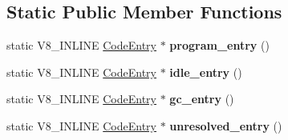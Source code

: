 \subsection*{Static Public Member Functions}
\begin{DoxyCompactItemize}
\item 
\mbox{\label{classv8_1_1internal_1_1CodeEntry_ae46bd95cd925a33436b007edaf1cb382}} 
static V8\+\_\+\+I\+N\+L\+I\+NE \mbox{\hyperlink{classv8_1_1internal_1_1CodeEntry}{Code\+Entry}} $\ast$ {\bfseries program\+\_\+entry} ()
\item 
\mbox{\label{classv8_1_1internal_1_1CodeEntry_af967b3b9da0154f68acc1e1c83798410}} 
static V8\+\_\+\+I\+N\+L\+I\+NE \mbox{\hyperlink{classv8_1_1internal_1_1CodeEntry}{Code\+Entry}} $\ast$ {\bfseries idle\+\_\+entry} ()
\item 
\mbox{\label{classv8_1_1internal_1_1CodeEntry_a7012418efaf8f148bc37a791173bab98}} 
static V8\+\_\+\+I\+N\+L\+I\+NE \mbox{\hyperlink{classv8_1_1internal_1_1CodeEntry}{Code\+Entry}} $\ast$ {\bfseries gc\+\_\+entry} ()
\item 
\mbox{\label{classv8_1_1internal_1_1CodeEntry_abf6245cd860f911a0a7e08b7a6455560}} 
static V8\+\_\+\+I\+N\+L\+I\+NE \mbox{\hyperlink{classv8_1_1internal_1_1CodeEntry}{Code\+Entry}} $\ast$ {\bfseries unresolved\+\_\+entry} ()
\end{DoxyCompactItemize}
